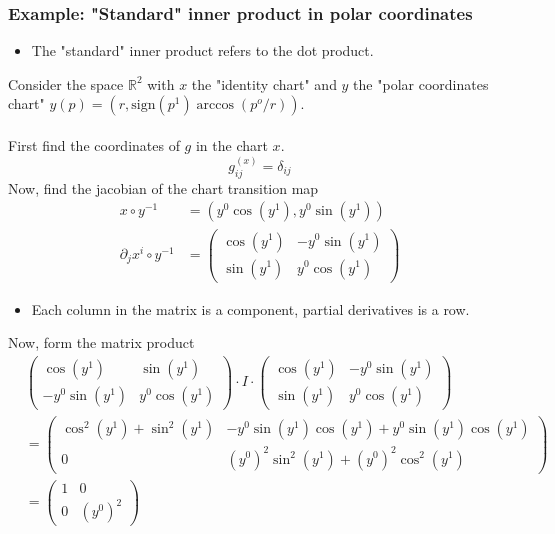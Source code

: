 \documentclass[10pt]{article}
\begin{document}
\subsubsection*{Example: "Standard" inner product in polar coordinates}
\begin{itemize}
    \item The "standard" inner product refers to the dot product.
\end{itemize}
Consider the space $\mathbb{R}^2$ with $x$ the "identity chart" and $y$ the "polar coordinates chart" $y(p) = (r, \text{sign}(p^1) \arccos(p^o/r))$.\\\\
First find the coordinates of $g$ in the chart $x$.
\[g_{ij}^(x) = \delta_{ij}\]
Now, find the jacobian of the chart transition map
\begin{align*}
    x \circ y^{-1} &= (y^0 \cos(y^1), y^0 \sin(y^1))\\
    \partial_j x^i \circ y^{-1} &= \begin{pmatrix} \cos(y^1) & -y^0 \sin(y^1) \\ \sin(y^1) & y^0 \cos(y^1) \end{pmatrix}
\end{align*}
\begin{itemize}
    \item Each column in the matrix is a component, partial derivatives is a row.
\end{itemize}
Now, form the matrix product
\begin{align*}
    &\begin{pmatrix}
        \cos(y^1) & \sin(y^1) \\ -y^0 \sin(y^1) & y^0 \cos(y^1)
    \end{pmatrix} \cdot I \cdot \begin{pmatrix}
        \cos(y^1) & -y^0 \sin(y^1) \\ \sin(y^1) & y^0 \cos(y^1)
    \end{pmatrix}\\
    &= \begin{pmatrix}
        \cos^2(y^1) + \sin^2(y^1) & -y^0 \sin(y^1) \cos(y^1) + y^0 \sin(y^1) \cos(y^1) \\ 0 & (y^0)^2 \sin^2(y^1) + (y^0)^2 \cos^2(y^1) \end{pmatrix}\\
    &= \begin{pmatrix}
        1 & 0 \\ 0 & (y^0)^2
    \end{pmatrix}
\end{align*}
\end{document}
